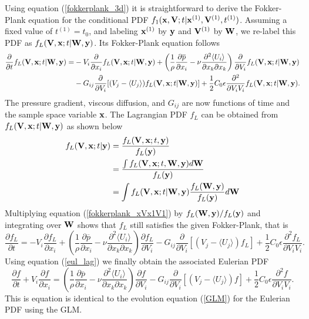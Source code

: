 \documentclass[oneside,a4paper,11pt]{report}
\newcommand{\pavg}{\overline{p}}
\newcommand{\uiavg}{\langle U_i \rangle}
\newcommand{\ujavg}{\langle U_j \rangle}
\begin{document}
Using equation (\ref{fokkerplank_3d}) it is straightforward to derive the Fokker-Plank equation for the conditional PDF $f_1(\mathbf{x},\mathbf{V};t | \mathbf{x}^{(1)}, \mathbf{V}^{(1)}, t^{(1)})$. Assuming a fixed value of $t^{(1)} = t_0$, and labeling $\mathbf{x}^{(1)}$ by $\mathbf{y}$ and $\mathbf{V}^{(1)}$ by $\mathbf{W}$, we re-label this PDF as $f_L(\mathbf{V}, \mathbf{x}; t | \mathbf{W}, \mathbf{y})$. Its Fokker-Plank equation follows
\begin{align}
\label{fokkerplank_xVx1V1}
\frac{\partial}{\partial t} f_L(\Vvec, \xvec; t | \Wvec, \yvec) = &-V_i\frac{\partial} {\partial x_i}f_L(\Vvec, \xvec; t | \Wvec, \yvec) + \left (\frac{1}{\rho} \frac{\partial \pavg}{\partial x_i}  -\nu \frac{\partial^2 \uiavg}{\partial x_k \partial x_k} \right ) \frac{\partial}{\partial V_i}f_L(\Vvec, \xvec; t | \Wvec, \yvec) \nonumber \\
&- G_{ij}\frac{\partial}{\partial V_i} [(V_j - \ujavg) f_L(\Vvec, \xvec; t | \Wvec, \yvec) ] + \frac{1}{2} C_0 \epsilon \frac{\partial ^2}{\partial V_i V_i} f_L(\Vvec, \xvec; t | \Wvec, \yvec ).
\end{align}
The pressure gradient, viscous diffusion, and $G_{ij}$ are now functions of time and the sample space variable $\mathbf{x}$. The Lagrangian PDF $f_L$ can be obtained from $f_L(\mathbf{V}, \mathbf{x}; t| \mathbf{W}, \mathbf{y})$ as shown below
\begin{align}
f_L(\mathbf{V}, \mathbf{x}; t | \mathbf{y}) &= \frac{ f_L(\mathbf{V}, \mathbf{x}; t, \mathbf{y})}{f_L(\mathbf{y})} \nonumber \\
& = \frac{ \int f_L(\mathbf{V}, \mathbf{x}; t, \mathbf{W}, \mathbf{y}) d\mathbf{W} }{f_L(\mathbf{y})} \nonumber \\
& =  \int f_L(\mathbf{V}, \mathbf{x}; t | \mathbf{W}, \mathbf{y}) \frac{ f_L(\mathbf{W}, \mathbf{y}) }{  f_L(\mathbf{y})  } d\mathbf{W} 
\end{align}
Multiplying equation (\ref{fokkerplank_xVx1V1}) by $f_L(\mathbf{W}, \mathbf{y}) / f_L(\mathbf{y})$ and integrating over $\mathbf{W}$ shows that $f_L$ still satisfies the given Fokker-Plank, that is
\begin{equation}
\frac{\partial f_L}{\partial t} = -V_i\frac{\partial f_L} {\partial x_i} + \left ( \frac{1}{\rho} \frac{\partial \pavg}{\partial x_i} - \nu \frac{\partial^2 \uiavg}{\partial x_k \partial x_k} \right ) \frac{\partial f_L}{\partial V_i} - G_{ij}\frac{\partial}{\partial V_i} [(V_j - \ujavg) f_L] + \frac{1}{2} C_0 \epsilon \frac{\partial ^2 f_L}{\partial V_i V_i}.
\end{equation}
Using equation (\ref{eul_lag}) we finally obtain the associated Eulerian PDF
\begin{equation}
\label{GLM2}
\frac{\partial f}{\partial t}  + V_i\frac{\partial f} {\partial x_i} =  \left ( \frac{1}{\rho} \frac{\partial \pavg}{\partial x_i} - \nu \frac{\partial^2 \uiavg}{\partial x_k \partial x_k} \right ) \frac{\partial f}{\partial V_i} - G_{ij}\frac{\partial}{\partial V_i} [(V_j - \ujavg) f] + \frac{1}{2} C_0 \epsilon \frac{\partial ^2 f}{\partial V_i V_i}.
\end{equation}
This is equation is identical to the evolution equation (\ref{GLM}) for the Eulerian PDF using the GLM.
\end{document}
